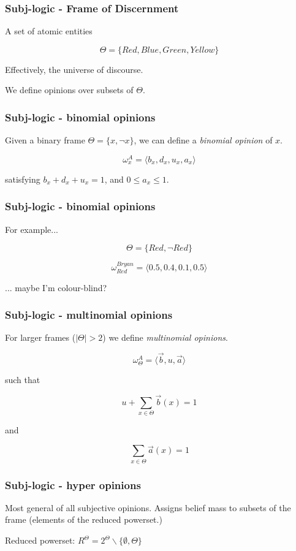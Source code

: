 \documentclass{beamer}
\begin{document}
\begin{frame}
\frametitle{Subj-logic - Frame of Discernment}

A set of atomic entities

$$\Theta = \lbrace Red, Blue, Green, Yellow \rbrace$$

Effectively, the universe of discourse.

We define opinions over subsets of $\Theta$.

\end{frame}

\begin{frame}
\frametitle{Subj-logic - binomial opinions}

Given a binary frame $\Theta = \lbrace x, \lnot x \rbrace$, we can define a
\emph{binomial opinion} of $x$.

$$\omega_{x}^A = \langle b_x, d_x, u_x, a_x \rangle$$

satisfying $b_x + d_x + u_x = 1$, and $0 \leq a_x \leq 1$.

\end{frame}

\begin{frame}
\frametitle{Subj-logic - binomial opinions}

For example...

$$\Theta = \lbrace Red, \lnot Red \rbrace$$

$$\omega_{Red}^{Bryan} = \langle 0.5, 0.4, 0.1, 0.5 \rangle$$

... maybe I'm colour-blind?

\end{frame}

\begin{frame}
\frametitle{Subj-logic - multinomial opinions}

For larger frames ($|\Theta| > 2$) we define \emph{multinomial opinions}.

$$ \omega_\Theta^A = \langle \vec{b}, u, \vec{a} \rangle $$

such that

$$u + \sum_{x \in \Theta} \vec{b}(x) = 1$$

and

$$\sum_{x\in \Theta} \vec{a}(x) = 1$$

\end{frame}

\begin{frame}
\frametitle{Subj-logic - hyper opinions}

Most general of all subjective opinions. Assigns belief mass to subsets of the
frame (elements of the reduced powerset.)

Reduced powerset: $R^\Theta = 2^\Theta \backslash \lbrace \emptyset, \Theta \rbrace$

\end{frame}
\end{document}
